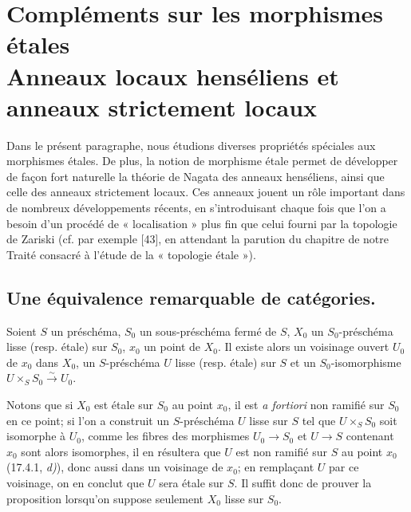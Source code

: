 \section[Compléments sur les morphismes étales. Anneaux locaux henséliens et anneaux strictement locaux]{Compléments sur les morphismes étales\\Anneaux locaux henséliens et anneaux strictement locaux}
\label{section:IV.18}

Dans le présent paragraphe, nous étudions diverses propriétés spéciales aux morphismes étales. De plus, la notion de morphisme étale permet de développer de façon fort naturelle la théorie de Nagata des anneaux henséliens, ainsi que celle des anneaux strictement locaux. Ces anneaux jouent un rôle important dans de nombreux développements récents, en s'introduisant chaque fois que l'on a besoin d'un procédé de « localisation » plus fin que celui fourni par la topologie de Zariski (cf. par exemple [43], en attendant la parution du chapitre de notre Traité consacré à l'étude de la « topologie étale »).

\subsection{Une équivalence remarquable de catégories.}

\begin{proposition}[18.1.1]
\label{IV.18.1.1}
Soient $S$ un préschéma, $S_0$ un sous-préschéma fermé de $S$, $X_0$ un $S_0$-préschéma lisse \textup{(resp.} étale\textup{)} sur $S_0$, $x_0$ un point de $X_0$. Il existe alors un voisinage ouvert $U_0$ de $x_0$ dans $X_0$, un $S$-préschéma $U$ lisse \textup{(resp.} étale\textup{)} sur $S$ et un $S_0$-isomorphisme $U\times_S S_0\xrightarrow{\sim}U_0$.
\end{proposition}

Notons que si $X_0$ est étale sur $S_0$ au point $x_0$, il est \emph{a fortiori} non ramifié sur $S_0$ en ce point; si l'on a construit un $S$-préschéma $U$ lisse sur $S$ tel que $U\times_S S_0$ soit isomorphe à $U_0$, comme les fibres des morphismes $U_0\to S_0$ et $U\to S$ contenant $x_0$ sont alors isomorphes, il en résultera que $U$ est non ramifié sur $S$ au point $x_0$ (17.4.1, \emph{d)}), donc aussi dans un voisinage de $x_0$; en remplaçant $U$ par ce voisinage, on en conclut que $U$ sera étale sur $S$. Il suffit donc de prouver la proposition lorsqu'on suppose seulement $X_0$ lisse sur $S_0$.

